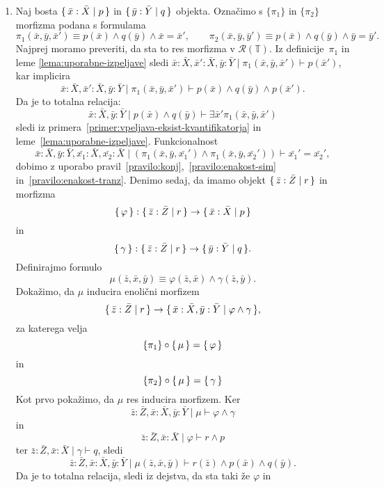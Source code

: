 \documentclass[../kategoricna_logika.tex]{subfiles}
\begin{document}
\begin{dokaz}
\begin{enumerate}[label=(\roman*)]
    \item Naj bosta $\lbrace\,\bar{x}:\bar{X} \mid p\,\rbrace$ in $\lbrace\,\bar{y}:\bar{Y} \mid q\,\rbrace$ objekta.
      Označimo s $\{\pi_1\}$ in $\{\pi_2\}$ morfizma podana s formulama
      \[ \pi_1(\bar{x},\bar{y},\bar{x}') \equiv p(\bar{x}) \land q(\bar{y}) \land \bar{x}=\bar{x}', \qquad
        \pi_2(\bar{x},\bar{y},\bar{y}') \equiv p(\bar{x}) \land q(\bar{y}) \land \bar{y}=\bar{y}'.
      \]
      Najprej moramo preveriti, da sta to res morfizma v
      $\mathcal{R}(\mathbb{T})$.  Iz definicije~$\pi_1$ in leme
      \ref{lema:uporabne-izpeljave} sledi
      $\bar{x}:\bar{X},\bar{x}':\bar{X},\bar{y}:\bar{Y} \mid \pi_1(\bar{x},\bar{y},\bar{x}') \vdash  p(\bar{x}')$, kar implicira
    $$\bar{x}:\bar{X},\bar{x}':\bar{X},\bar{y}:\bar{Y} \mid \pi_1(\bar{x},\bar{y},\bar{x}') \vdash p(\bar{x}) \land q(\bar{y}) \land p(\bar{x}').$$
    Da je to totalna relacija:
    $$\bar{x}:\bar{X},\bar{y}:\bar{Y} \mid p(\bar{x}) \land q(\bar{y}) \vdash \exists \bar{x}' \pi_1(\bar{x},\bar{y},\bar{x}')$$
    sledi iz
    primera~\ref{primer:vpeljava-eksist-kvantifikatorja} in leme~\ref{lema:uporabne-izpeljave}.
    Funkcionalnost
    \[ \bar{x}:\bar{X},\bar{y}:\bar{Y},\bar{x_1}:\bar{X},\bar{x_2}:\bar{X} \mid (\pi_1(\bar{x},\bar{y},\bar{x_1}') \land
      \pi_1(\bar{x},\bar{y},\bar{x_2}')) \vdash \bar{x_1}' = \bar{x_2}',\]
    dobimo z uporabo pravil~\ref{pravilo:konj},~\ref{pravilo:enakost-sim} in~\ref{pravilo:enakost-tranz}.
    Denimo sedaj, da imamo objekt $\lbrace\,\bar{z}:\bar{Z} \mid r\,\rbrace$ in morfizma
    $${\lbrace\,\varphi\,\rbrace : \lbrace\,\bar{z}:\bar{Z} \mid r\,\rbrace \to \lbrace\,\bar{x}:\bar{X} \mid p\,\rbrace}$$
    in
    $$\lbrace\,\gamma\,\rbrace : \lbrace\,\bar{z}:\bar{Z} \mid r\,\rbrace \to \lbrace\,\bar{y}:\bar{Y} \mid q\,\rbrace.$$
    Definirajmo formulo
    \[ \mu(\bar{z},\bar{x},\bar{y}) \equiv \varphi(\bar{z},\bar{x}) \land \gamma(\bar{z},\bar{y}). \]
    Dokažimo, da $\mu$ inducira enolični morfizem
    $$\lbrace\,\bar{z}:\bar{Z} \mid r\,\rbrace \to \lbrace\,\bar{x}:\bar{X},\bar{y}:\bar{Y} \mid \varphi \land \gamma\,\rbrace,$$
    za
    katerega velja
    $$\{\pi_1\} \circ \lbrace\,\mu\,\rbrace = \lbrace\,\varphi\,\rbrace$$
    in
    $$\{\pi_2\} \circ \lbrace\,\mu\,\rbrace = \lbrace\,\gamma\,\rbrace$$
    Kot prvo pokažimo,
    da $\mu$ res inducira morfizem.  Ker
    $$\bar{z}:\bar{Z},\bar{x}:\bar{X},\bar{y}:\bar{Y} \mid \mu \vdash \varphi \land \gamma$$
    in $$\bar{z}:\bar{Z},\bar{x}:\bar{X} \mid \varphi \vdash r \land p$$
    ter $\bar{z}:\bar{Z}, \bar{x}:\bar{X} \mid \gamma \vdash q$,
    sledi
    $$\bar{z}:\bar{Z},\bar{x}:\bar{X},\bar{y}:\bar{Y} \mid  \mu(\bar{z},\bar{x},\bar{y}) \vdash r(\bar{z}) \land p(\bar{x}) \land q(\bar{y}).$$
    Da je to
    totalna relacija, sledi iz dejstva, da sta taki že $\varphi$ in

\end{enumerate}
\end{dokaz}
\end{document}
